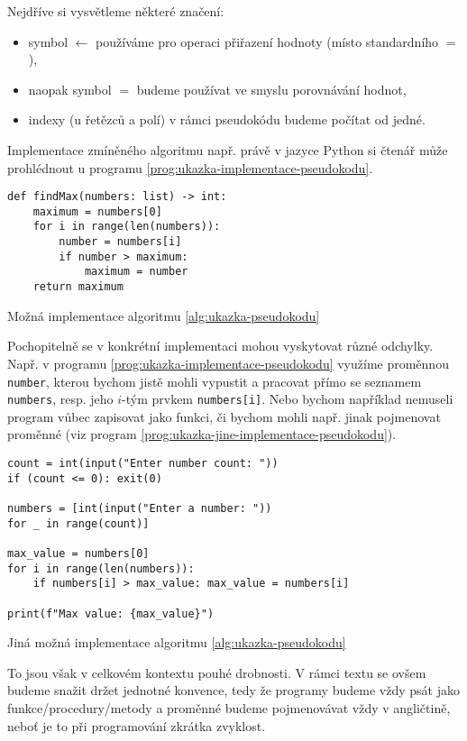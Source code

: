 Nejdříve si vysvětleme některé značení:
\begin{itemize}
    \item symbol $\gets$ používáme pro operaci přiřazení hodnoty (místo standardního $=$),
    \item naopak symbol $=$ budeme používat ve smyslu porovnávání hodnot,
    \item indexy (u řetězců a polí) v rámci pseudokódu budeme počítat od jedné.
\end{itemize}
Implementace zmíněného algoritmu např. právě v jazyce Python si čtenář může prohlédnout u programu \ref{prog:ukazka-implementace-pseudokodu}.
\begin{program}[h]
\begin{lstlisting}[style=python]
def findMax(numbers: list) -> int:
    maximum = numbers[0]
    for i in range(len(numbers)):
        number = numbers[i]
        if number > maximum:
            maximum = number
    return maximum
\end{lstlisting}
    \caption{Možná implementace algoritmu \ref{alg:ukazka-pseudokodu}}
    \label{prog:ukazka-implementace-pseudokodu}
\end{program}
Pochopitelně se v konkrétní implementaci mohou vyskytovat různé odchylky. Např. v programu \ref{prog:ukazka-implementace-pseudokodu} využíme proměnnou \texttt{number}, kterou bychom jistě mohli vypustit a pracovat přímo se seznamem \texttt{numbers}, resp. jeho $i$-tým prvkem \texttt{numbers[i]}. Nebo bychom například nemuseli program vůbec zapisovat jako funkci, či bychom mohli např. jinak pojmenovat proměnné (viz program \ref{prog:ukazka-jine-implementace-pseudokodu}).
\begin{program}[h]
\begin{lstlisting}[style=python]
count = int(input("Enter number count: "))
if (count <= 0): exit(0)

numbers = [int(input("Enter a number: "))
for _ in range(count)]

max_value = numbers[0]
for i in range(len(numbers)):
    if numbers[i] > max_value: max_value = numbers[i]

print(f"Max value: {max_value}")
\end{lstlisting}
    \caption{Jiná možná implementace algoritmu \ref{alg:ukazka-pseudokodu}}
    \label{prog:ukazka-jine-implementace-pseudokodu}
    \end{program}
To jsou však v celkovém kontextu pouhé drobnosti. V rámci textu se ovšem budeme snažit držet jednotné konvence, tedy že programy budeme vždy psát jako funkce/procedury/metody a proměnné budeme pojmenovávat vždy v angličtině, neboť je to při programování zkrátka zvyklost.
